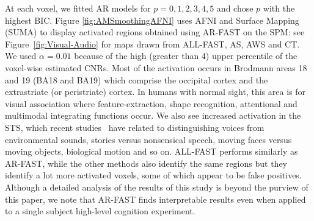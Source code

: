 At each voxel, we fitted AR models for 
$p=0,1,2,3,4,5$ and chose $p$ with the highest BIC. 
Figure \ref{fig:AMSmoothingAFNI} uses AFNI and Surface Mapping (SUMA)
to display activated regions obtained using AR-FAST on the SPM:
see  Figure~\ref{fig:Visual-Audio} for  maps drawn from ALL-FAST, AS,
AWS and CT. We used $\alpha = 0.01$ because of the high (greater than
4) upper percentile of the voxel-wise estimated CNRs. Most of the activation 
occurs in Brodmann areas 18 and 19 (BA18 and BA19)
which comprise the
occipital cortex %
and the extrastriate (or peristriate) cortex. In humans with normal
sight,  this area is for visual association where 
feature-extraction, shape recognition, attentional and multimodal
integrating functions occur. We also see increased activation in
the STS, which recent
studies~\citep{grossman2001brain} have related to  distinguishing
voices from environmental sounds, 
stories versus nonsensical speech, moving faces versus moving objects,
biological motion and so on. ALL-FAST performs similarly as AR-FAST,
while the other methods also identify the same regions but they identify
a lot more activated 
voxels, some of which appear to be false positives. Although a 
detailed analysis of the results of this study is beyond the purview
of this paper, we note that AR-FAST 
finds interpretable results even when applied to a single
subject high-level cognition experiment. 
\begin{comment}
\begin{table}[h!]
\centering
\caption{Coordinates of the maximum $t$-statistic and its corresponding value}\label{tab:maxt}
\begin{tabular}{c|c}
Task & $(x,y,z) mm$  \\
\hline
Visual-Audio & (-30.162,86.221,6.349) \\
Audio & (-27.412,75.221,-5.651)  \\
 Visual & (-30.162, 80.721, 15.349) \\
\hline
\end{tabular}
\end{table}
\end{comment}
